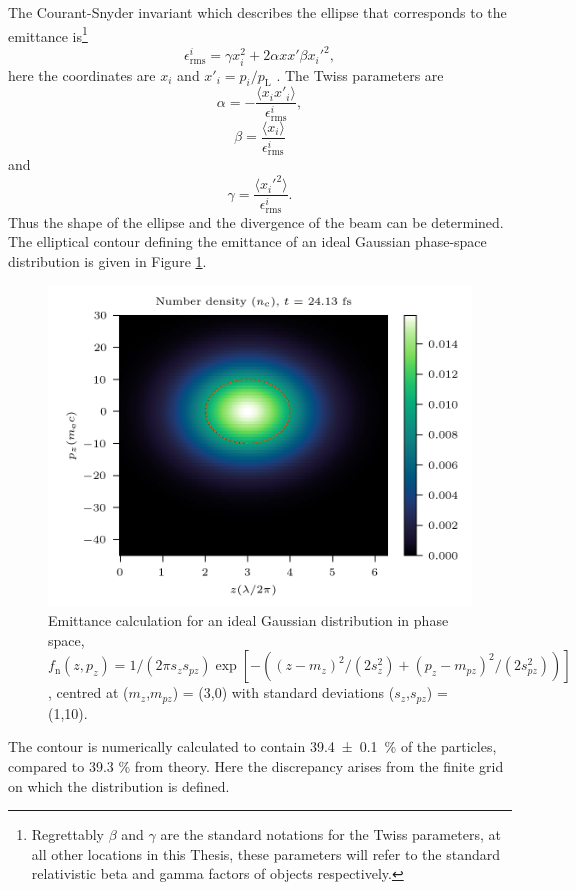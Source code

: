 The Courant-Snyder invariant which describes the ellipse that corresponds to the emittance is\footnote{Regrettably $\beta$ and $\gamma$ are the standard notations for the Twiss parameters, at all other locations in this Thesis, these parameters will refer to the standard relativistic beta and gamma factors of objects respectively.}
\begin{equation}
	\epsilon^i_\mathrm{rms}  = \gamma x_i^2 + 2\alpha x x' \beta x_i'^2,
\end{equation}
here the coordinates are $x_i$ and $x'_i = p_i/p_\mathrm{L}$ \cite{wiedemannParticleAcceleratorPhysics2015}. The Twiss parameters are
\begin{equation}
	\alpha = - \frac{\langle x_i x'_i \rangle}{	\epsilon^i_\mathrm{rms} },
\end{equation}
\begin{equation}
	\beta = \frac{\langle x_i \rangle}{	\epsilon^i_\mathrm{rms} }
\end{equation}
and
\begin{equation}
	\gamma = \frac{\langle x_i'^2 \rangle}{	\epsilon^i_\mathrm{rms} }.
\end{equation}
Thus the shape of the ellipse and the divergence of the beam can be determined. The elliptical contour defining the emittance of an ideal Gaussian phase-space distribution is given in Figure \ref{fig:emittancenormal}.
\begin{figure}
	\centering
	\includegraphics[width=0.7\linewidth]{figures/appendix/emittance_normal}
	\caption[Emittance calculation for an ideal Gaussian distribution in phase space.]{Emittance calculation for an ideal Gaussian distribution in phase space, $f_\mathrm{n}(z,p_z) = 1/(2\pi s_zs_{pz})\exp[-((z-m_z)^2/(2s_z^2) + (p_z-m_{pz})^2/(2s_{pz}^2))]$, centred at ($m_z$,$m_{pz}$) = (3,0) with standard deviations ($s_z$,$s_{pz}$) = (1,10).}
	\label{fig:emittancenormal}
\end{figure}
The contour is numerically calculated to contain \qty{39.4 \pm .1}{\%} of the particles, compared to 39.3 \% from theory. Here the discrepancy arises from the finite grid on which the distribution is defined.


